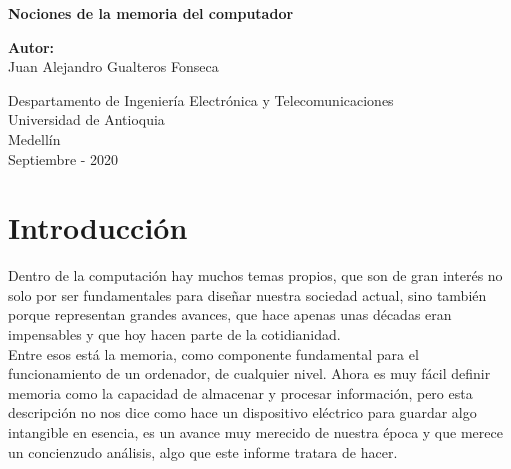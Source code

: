 \documentclass{article}
\begin{document}
	
	\begin{titlepage}
		\begin{center}
			\vspace*{1cm}
			
			\Huge{\textbf{Nociones de la memoria del computador}}
			
			\vspace{7cm}
			
			\Large{\textbf{Autor:}\\Juan Alejandro Gualteros Fonseca}
			
			\vfill
			
			\vspace{0.5cm}
			
			\Large
			Despartamento de Ingeniería Electrónica y Telecomunicaciones\\
			Universidad de Antioquia\\
			Medellín\\
			Septiembre - 2020
			
		\end{center}
	\end{titlepage}
	
	\newpage
	
	\tableofcontents
	
	\newpage
	
	\section{Introducción}\label{intro}
	Dentro de la computación hay muchos temas propios, que son de gran interés no solo por ser fundamentales para diseñar nuestra sociedad actual, sino también porque representan grandes avances, que hace apenas unas décadas eran impensables y que hoy hacen parte de la cotidianidad.\\
	Entre esos está la memoria, como componente fundamental para el funcionamiento de un ordenador, de cualquier nivel. Ahora es muy fácil definir memoria como la capacidad de almacenar y procesar información, pero esta descripción no nos dice como hace un dispositivo eléctrico para guardar algo intangible en esencia, es un avance muy merecido de nuestra época y que merece un concienzudo análisis, algo que este informe tratara de hacer. 
	
	\newpage
	
\end{document}
